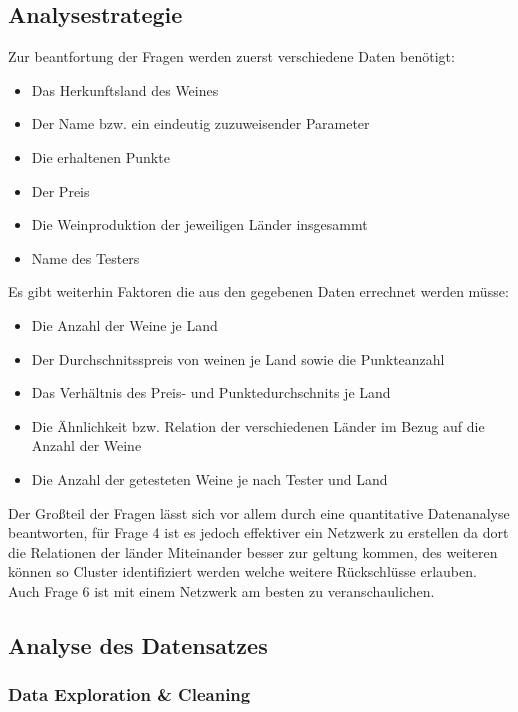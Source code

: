 \documentclass[
]{article}
\begin{document}
\subsection{Analysestrategie}\label{analysestrategie}

Zur beantfortung der Fragen werden zuerst verschiedene Daten benötigt:

\begin{itemize}
\item
  Das Herkunftsland des Weines
\item
  Der Name bzw. ein eindeutig zuzuweisender Parameter
\item
  Die erhaltenen Punkte
\item
  Der Preis
\item
  Die Weinproduktion der jeweiligen Länder insgesammt
\item
  Name des Testers
\end{itemize}

Es gibt weiterhin Faktoren die aus den gegebenen Daten errechnet werden
müsse:

\begin{itemize}
\item
  Die Anzahl der Weine je Land
\item
  Der Durchschnitsspreis von weinen je Land sowie die Punkteanzahl
\item
  Das Verhältnis des Preis- und Punktedurchschnits je Land
\item
  Die Ähnlichkeit bzw. Relation der verschiedenen Länder im Bezug auf
  die Anzahl der Weine
\item
  Die Anzahl der getesteten Weine je nach Tester und Land
\end{itemize}

Der Großteil der Fragen lässt sich vor allem durch eine quantitative
Datenanalyse beantworten, für Frage 4 ist es jedoch effektiver ein
Netzwerk zu erstellen da dort die Relationen der länder Miteinander
besser zur geltung kommen, des weiteren können so Cluster identifiziert
werden welche weitere Rückschlüsse erlauben. Auch Frage 6 ist mit einem
Netzwerk am besten zu veranschaulichen.

\subsection{Analyse des Datensatzes}\label{analyse-des-datensatzes}

\subsubsection{Data Exploration \&
Cleaning}\label{data-exploration-cleaning}
\end{document}
